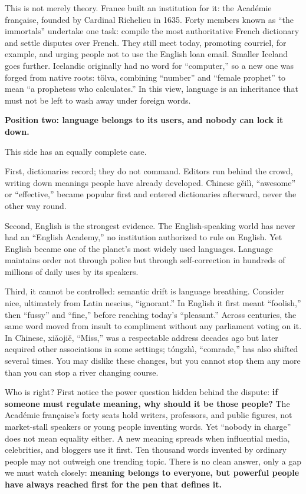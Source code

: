 This is not merely theory. France built an institution for it: the Académie française, founded by Cardinal Richelieu in 1635. Forty members known as ``the immortals'' undertake one task: compile the most authoritative French dictionary and settle disputes over French. They still meet today, promoting courriel, for example, and urging people not to use the English loan email. Smaller Iceland goes further. Icelandic originally had no word for ``computer,'' so a new one was forged from native roots: tölva, combining ``number'' and ``female prophet'' to mean ``a prophetess who calculates.'' In this view, language is an inheritance that must not be left to wash away under foreign words.

\textbf{Position two: language belongs to its users, and nobody can lock it down.}

This side has an equally complete case.

First, dictionaries record; they do not command. Editors run behind the crowd, writing down meanings people have already developed. Chinese gěilì, ``awesome'' or ``effective,'' became popular first and entered dictionaries afterward, never the other way round.

Second, English is the strongest evidence. The English-speaking world has never had an ``English Academy,'' no institution authorized to rule on English. Yet English became one of the planet's most widely used languages. Language maintains order not through police but through self-correction in hundreds of millions of daily uses by its speakers.

Third, it cannot be controlled: semantic drift is language breathing. Consider nice, ultimately from Latin nescius, ``ignorant.'' In English it first meant ``foolish,'' then ``fussy'' and ``fine,'' before reaching today's ``pleasant.'' Across centuries, the same word moved from insult to compliment without any parliament voting on it. In Chinese, xiǎojiě, ``Miss,'' was a respectable address decades ago but later acquired other associations in some settings; tóngzhì, ``comrade,'' has also shifted several times. You may dislike these changes, but you cannot stop them any more than you can stop a river changing course.

Who is right? First notice the power question hidden behind the dispute: \textbf{if someone must regulate meaning, why should it be those people?} The Académie française's forty seats hold writers, professors, and public figures, not market-stall speakers or young people inventing words. Yet ``nobody in charge'' does not mean equality either. A new meaning spreads when influential media, celebrities, and bloggers use it first. Ten thousand words invented by ordinary people may not outweigh one trending topic. There is no clean answer, only a gap we must watch closely: \textbf{meaning belongs to everyone, but powerful people have always reached first for the pen that defines it.}

